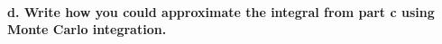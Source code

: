 \documentclass[]{article}
\let\oldparagraph\paragraph
\renewcommand{\paragraph}[1]{\oldparagraph{#1}\mbox{}}
\begin{document}
\hypertarget{d.-write-how-you-could-approximate-the-integral-from-part-c-using-monte-carlo-integration.}{%
\paragraph{d. Write how you could approximate the integral from part c
using Monte Carlo
integration.}\label{d.-write-how-you-could-approximate-the-integral-from-part-c-using-monte-carlo-integration.}}
\end{document}
